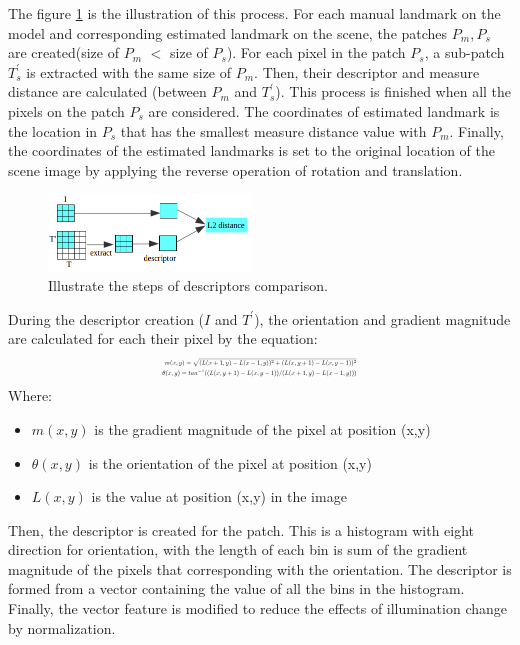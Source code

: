 \documentclass[twoside,twocolumn,10pt]{article}
\begin{document}
The figure \ref{fig:Illustrate} is the illustration of this process. For each manual landmark on the model and corresponding estimated landmark on the scene, the patches \textit{$P_m, P_s$} are created(size of $P_m$ $<$ size of $P_s$). For each pixel in the patch \textit{$P_s$}, a sub-patch \textit{$T^{'}_s$} is extracted with the same size of \textit{$P_m$}. Then, their descriptor and measure distance are calculated (between \textit{$P_m$} and \textit{$T^{'}_s$}). This process is finished when all the pixels on the patch \textit{$P_s$} are considered. The coordinates of estimated landmark is the location in \textit{$P_s$} that has the smallest measure distance value with \textit{$P_m$}. Finally, the coordinates of the estimated landmarks is set to the original location of the scene image by applying the reverse operation of rotation and translation.
\begin{figure}[htb]
    \centering
    \includegraphics[width=0.48\textwidth]{./images/illustration_SIFT}
    \caption{Illustrate the steps of descriptors comparison.}
    \label{fig:Illustrate}
\end{figure}

During the descriptor creation (\textit{$I$} and \textit{$T^{'}$}), the orientation and gradient magnitude are calculated for each their pixel by the equation:
\begin{equation}
\label{eq:sift}
\resizebox{.41 \textwidth}{!} 
{$
\begin{aligned}
	m(x,y) = \sqrt{(L(x+1,y) - L(x-1,y))^2 + (L(x,y+1) - L(x,y-1))^2} \\
	\theta(x,y) = tan^{-1}((L(x,y+1) - L(x,y-1))/(L(x+1,y) - L(x-1,y)))
	\end{aligned}
$}
\end{equation}
Where:
\begin{itemize}
	\item $m(x,y)$ is the gradient magnitude of the pixel at position (x,y)
	\item $\theta(x,y)$ is the orientation of the pixel at position (x,y)
	\item $L(x,y)$ is the value at position (x,y) in the image
\end{itemize}
Then, the descriptor is created for the patch. This is a histogram with eight direction for orientation, with the length of each bin is sum of the gradient magnitude of the pixels that corresponding  with the orientation. The descriptor is formed from a vector containing the value of all the bins in the histogram. Finally, the vector feature is modified to reduce the effects of illumination change by normalization.
\end{document}
